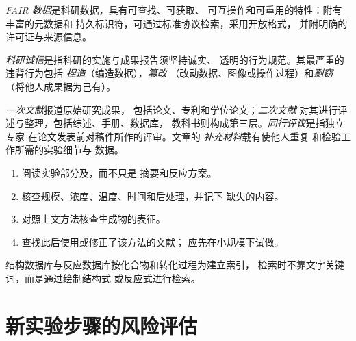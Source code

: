 \begin{definition}[FAIR 数据]\label{def:b3:lab-techniques-3:fair}
\emph{FAIR 数据}是科研数据，具有可查找、可获取、
可互操作和可重用的特性：附有丰富的元数据和
持久标识符，可通过标准协议检索，采用开放格式，
并附明确的许可证与来源信息。
\end{definition}

\begin{definition}[科研诚信]\label{def:b3:lab-techniques-3:integrity}
\emph{科研诚信}是指科研的实施与成果报告须坚持诚实、
透明的行为规范。其最严重的违背行为包括
\emph{捏造}（编造数据），\emph{篡改}
（改动数据、图像或操作过程）和\emph{剽窃}
（将他人成果据为己有）。
\end{definition}

\begin{definition}[文献]\label{def:b3:lab-techniques-3:literature}
\emph{一次文献}报道原始研究成果，
包括论文、专利和学位论文；\emph{二次文献}
对其进行评述与整理，包括综述、手册、数据库，
教科书则构成第三层。\emph{同行评议}是指独立专家
在论文发表前对稿件所作的评审。文章的
\emph{补充材料}载有使他人重复
和检验工作所需的实验细节与
数据。
\end{definition}

\begin{method}[阅读已发表的实验方法]\label{met:b3:lab-techniques-3:read-paper}
\begin{enumerate}
  \item 阅读实验部分及，而不只是
        摘要和反应方案。
  \item 核查规模、浓度、温度、时间和后处理，并记下
        缺失的内容。
  \item 对照上文方法核查生成物的表征。
  \item 查找此后使用或修正了该方法的文献；
        应先在小规模下试做。
\end{enumerate}
\end{method}

结构数据库与反应数据库按化合物和转化过程为建立索引，
检索时不靠文字关键词，而是通过绘制结构式
或反应式进行检索。

\section{新实验步骤的风险评估}


